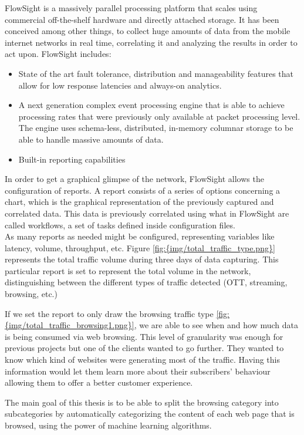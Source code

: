 
FlowSight\cite{flowsight} is a massively parallel processing platform that scales using commercial off-the-shelf hardware and directly attached storage. It has been conceived among other things, to collect
huge amounts of data from the mobile internet networks in real time, correlating it and analyzing the results in order to act upon. FlowSight includes:
\begin{itemize}
  \item{State of the art fault tolerance, distribution and manageability features that allow for low response latencies and always-on analytics.}
  \item{A next generation complex event processing engine that is able to achieve processing rates that were previously only available at packet processing level. The engine uses schema-less, 
        distributed, in-memory columnar storage to be able to handle massive amounts of data.}
  \item{Built-in reporting capabilities}
\end{itemize}
In order to get a graphical glimpse of the network, FlowSight allows the configuration of reports. A report consists of a series of options concerning a chart, which is the graphical representation
of the previously captured and correlated data. This data is previously correlated using what in FlowSight are called workflows, a set of tasks defined inside configuration files. \\
As many reports as needed might be configured, representing variables like latency, volume, throughput, etc.   
Figure \ref{fig:{img/total_traffic_type.png}} represents the total traffic volume during three days of data capturing. This particular report is set to represent the total volume in the network, 
distinguishing between the different types of traffic detected (OTT, streaming, browsing, etc.)

If we set the report to only draw the browsing traffic type \ref{fig:{img/total_traffic_browsing1.png}}, we are able to see when and how much data is being consumed via web browsing. This level of
granularity was enough for previous projects but one of the clients wanted to go further. They wanted to know which kind of websites were generating most of the traffic. Having this information
would let them learn more about their subscribers' behaviour allowing them to offer a better customer experience.


The main goal of this thesis is to be able to split the browsing category into subcategories by automatically categorizing the content of each web page that is browsed, using the power of machine learning
algorithms.


